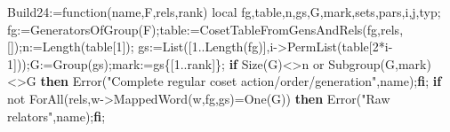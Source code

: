 \documentclass[
  10pt,
  letterpaper,
]{article}
\newenvironment{Shaded}{}{}
\newcommand{\BuiltInTok}[1]{\textcolor[rgb]{0.00,0.50,0.00}{#1}}
\newcommand{\ConstantTok}[1]{\textcolor[rgb]{0.53,0.00,0.00}{#1}}
\newcommand{\ControlFlowTok}[1]{\textcolor[rgb]{0.00,0.44,0.13}{\textbf{#1}}}
\newcommand{\ExtensionTok}[1]{#1}
\newcommand{\FloatTok}[1]{\textcolor[rgb]{0.25,0.63,0.44}{#1}}
\newcommand{\FunctionTok}[1]{\textcolor[rgb]{0.02,0.16,0.49}{#1}}
\newcommand{\NormalTok}[1]{#1}
\newcommand{\OperatorTok}[1]{\textcolor[rgb]{0.40,0.40,0.40}{#1}}
\newcommand{\StringTok}[1]{\textcolor[rgb]{0.25,0.44,0.63}{#1}}
\newcommand{\VariableTok}[1]{\textcolor[rgb]{0.10,0.09,0.49}{#1}}
\begin{document}
\begin{Shaded}
\begin{Highlighting}[]
\VariableTok{Build24}\OperatorTok{:=}\FunctionTok{function}\NormalTok{(}\VariableTok{name}\OperatorTok{,}\VariableTok{F}\OperatorTok{,}\VariableTok{rels}\OperatorTok{,}\VariableTok{rank}\NormalTok{)}
 \ExtensionTok{local} \VariableTok{fg}\OperatorTok{,}\VariableTok{table}\OperatorTok{,}\VariableTok{n}\OperatorTok{,}\VariableTok{gs}\OperatorTok{,}\VariableTok{G}\OperatorTok{,}\VariableTok{mark}\OperatorTok{,}\VariableTok{sets}\OperatorTok{,}\VariableTok{pars}\OperatorTok{,}\VariableTok{i}\OperatorTok{,}\VariableTok{j}\OperatorTok{,}\VariableTok{typ}\OperatorTok{;}
 \VariableTok{fg}\OperatorTok{:=}\BuiltInTok{GeneratorsOfGroup}\NormalTok{(}\VariableTok{F}\NormalTok{)}\OperatorTok{;}\VariableTok{table}\OperatorTok{:=}\BuiltInTok{CosetTableFromGensAndRels}\NormalTok{(}\VariableTok{fg}\OperatorTok{,}\VariableTok{rels}\OperatorTok{,}\NormalTok{[])}\OperatorTok{;}\VariableTok{n}\OperatorTok{:=}\BuiltInTok{Length}\NormalTok{(}\VariableTok{table}\NormalTok{[}\FloatTok{1}\NormalTok{])}\OperatorTok{;}
 \VariableTok{gs}\OperatorTok{:=}\BuiltInTok{List}\NormalTok{([}\FloatTok{1}\OperatorTok{..}\BuiltInTok{Length}\NormalTok{(}\VariableTok{fg}\NormalTok{)]}\OperatorTok{,}\VariableTok{i}\OperatorTok{{-}\textgreater{}}\BuiltInTok{PermList}\NormalTok{(}\VariableTok{table}\NormalTok{[}\FloatTok{2}\OperatorTok{*}\VariableTok{i}\OperatorTok{{-}}\FloatTok{1}\NormalTok{]))}\OperatorTok{;}\VariableTok{G}\OperatorTok{:=}\BuiltInTok{Group}\NormalTok{(}\VariableTok{gs}\NormalTok{)}\OperatorTok{;}\VariableTok{mark}\OperatorTok{:=}\VariableTok{gs}\NormalTok{\{[}\FloatTok{1}\OperatorTok{..}\VariableTok{rank}\NormalTok{]\}}\OperatorTok{;}
 \ControlFlowTok{if} \BuiltInTok{Size}\NormalTok{(}\VariableTok{G}\NormalTok{)}\OperatorTok{\textless{}\textgreater{}}\VariableTok{n} \ConstantTok{or} \BuiltInTok{Subgroup}\NormalTok{(}\VariableTok{G}\OperatorTok{,}\VariableTok{mark}\NormalTok{)}\OperatorTok{\textless{}\textgreater{}}\VariableTok{G} \ControlFlowTok{then} \BuiltInTok{Error}\NormalTok{(}\StringTok{"Complete regular coset action/order/generation"}\OperatorTok{,}\VariableTok{name}\NormalTok{)}\OperatorTok{;}\ControlFlowTok{fi}\OperatorTok{;}
 \ControlFlowTok{if} \ConstantTok{not} \BuiltInTok{ForAll}\NormalTok{(}\VariableTok{rels}\OperatorTok{,}\VariableTok{w}\OperatorTok{{-}\textgreater{}}\BuiltInTok{MappedWord}\NormalTok{(}\VariableTok{w}\OperatorTok{,}\VariableTok{fg}\OperatorTok{,}\VariableTok{gs}\NormalTok{)}\OperatorTok{=}\BuiltInTok{One}\NormalTok{(}\VariableTok{G}\NormalTok{)) }\ControlFlowTok{then} \BuiltInTok{Error}\NormalTok{(}\StringTok{"Raw relators"}\OperatorTok{,}\VariableTok{name}\NormalTok{)}\OperatorTok{;}\ControlFlowTok{fi}\OperatorTok{;}

\end{Highlighting}
\end{Shaded}
\end{document}
